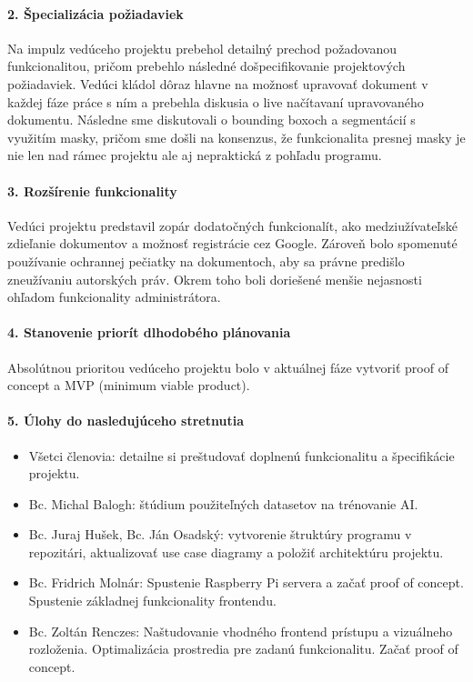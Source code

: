 \paragraph{2. Špecializácia požiadaviek}
Na impulz vedúceho projektu prebehol detailný prechod požadovanou funkcionalitou, pričom prebehlo následné došpecifikovanie projektových požiadaviek. Vedúci kládol dôraz hlavne na možnosť upravovať dokument v každej fáze práce s ním a prebehla diskusia o live načítavaní upravovaného dokumentu. Následne sme diskutovali o bounding boxoch a segmentácií s využitím masky, pričom sme došli na konsenzus, že funkcionalita presnej masky je nie len nad rámec projektu ale aj nepraktická z pohľadu programu.

\paragraph{3. Rozšírenie funkcionality}
Vedúci projektu predstavil zopár dodatočných funkcionalít, ako medziužívateľské zdieľanie dokumentov a možnosť registrácie cez Google. Zároveň bolo spomenuté používanie ochrannej pečiatky na dokumentoch, aby sa právne predišlo zneužívaniu autorských práv. Okrem toho boli doriešené menšie nejasnosti ohľadom funkcionality administrátora.

\paragraph{4. Stanovenie priorít dlhodobého plánovania}
Absolútnou prioritou vedúceho projektu bolo v aktuálnej fáze vytvoriť proof of concept a MVP (minimum viable product).

\paragraph{5. Úlohy do nasledujúceho stretnutia}
\begin{itemize}
    \item Všetci členovia: detailne si preštudovať doplnenú funkcionalitu a špecifikácie projektu.
    \item Bc. Michal Balogh: štúdium použiteľných datasetov na trénovanie AI.
    \item Bc. Juraj Hušek, Bc. Ján Osadský: vytvorenie štruktúry programu v repozitári, aktualizovať use case diagramy a položiť architektúru projektu.
    \item Bc. Fridrich Molnár: Spustenie Raspberry Pi servera a začať proof of concept. Spustenie základnej funkcionality frontendu.
    \item Bc. Zoltán Renczes: Naštudovanie vhodného frontend prístupu a vizuálneho rozloženia. Optimalizácia prostredia pre zadanú funkcionalitu. Začať proof of concept.
\end{itemize}

